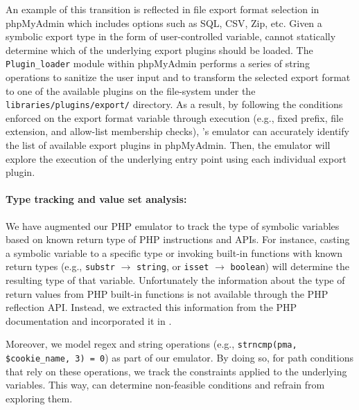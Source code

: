 An example of this transition is reflected in file export format selection in phpMyAdmin which includes options such as SQL, CSV, Zip, etc. 
Given a symbolic export type in the form of user-controlled variable, \animatedead{} cannot statically determine which of the underlying export plugins should be loaded. 
The \texttt{Plugin\_loader} module within phpMyAdmin performs a series of string operations to sanitize the user input and to transform the selected export format to one of the available plugins on the file-system under the \texttt{libraries/plugins/export/} directory. 
As a result, by following the conditions enforced on the export format variable through execution (e.g., fixed prefix, file extension, and allow-list membership checks), \animatedead{}'s emulator can accurately identify the list of available export plugins in phpMyAdmin. 
Then, the emulator will explore the execution of the underlying entry point using each individual export plugin. 

\paragraph{Type tracking and value set analysis:} 
We have augmented our PHP emulator to track the type of symbolic variables based on known return type of PHP instructions and APIs. 
For instance, casting a symbolic variable to a specific type or invoking built-in functions with known return types (e.g., \texttt{substr} $\rightarrow$ \texttt{string}, or \texttt{isset} $\rightarrow$ \texttt{boolean}) will determine the resulting type of that variable. 
Unfortunately the information about the type of return values from PHP built-in functions is not available through the PHP reflection API. 
Instead, we extracted this information from the PHP documentation and incorporated it in \animatedead{}. 

Moreover, we model regex and string operations (e.g., \texttt{strncmp(\textquotesingle{}pma\textquotesingle{}, \$cookie\_name, 3) \!= 0}) as part of our emulator. 
By doing so, for path conditions that rely on these operations, we track the constraints applied to the underlying variables. 
This way, \animatedead{} can determine non-feasible conditions and refrain from exploring them. 

